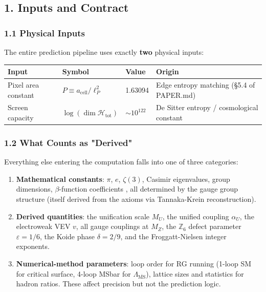 \subsection{1. Inputs and Contract}\label{1-inputs-and-contract}

\subsubsection{1.1 Physical Inputs}\label{11-physical-inputs}

The entire prediction pipeline uses exactly \textbf{two} physical inputs:

{\def\LTcaptype{none} %
\begin{longtable}[]{@{}llll@{}}
\toprule\noalign{}
Input & Symbol & Value & Origin \\
\midrule\noalign{}
\endhead
\bottomrule\noalign{}
\endlastfoot
Pixel area constant & \(P \equiv a_{\text{cell}}/\ell_P^2\) & 1.63094 & Edge entropy matching (§5.4 of PAPER.md) \\
Screen capacity & \(\log(\dim\mathcal{H}_{\text{tot}})\) & \(\sim 10^{122}\) & De Sitter entropy / cosmological constant \\
\end{longtable}
}

\subsubsection{1.2 What Counts as "Derived"}\label{12-what-counts-as-derived}

Everything else entering the computation falls into one of three categories:

\begin{enumerate}
\def\labelenumi{\arabic{enumi}.}
\item
  \textbf{Mathematical constants}: \(\pi\), \(e\), \(\zeta(3)\), Casimir eigenvalues, group dimensions, \(\beta\)-function coefficients , all determined by the gauge group structure (itself derived from the axioms via Tannaka-Krein reconstruction).
\item
  \textbf{Derived quantities}: the unification scale \(M_U\), the unified coupling \(\alpha_U\), the electroweak VEV \(v\), all gauge couplings at \(M_Z\), the \(\mathbb{Z}_6\) defect parameter \(\varepsilon = 1/6\), the Koide phase \(\delta = 2/9\), and the Froggatt-Nielsen integer exponents.
\item
  \textbf{Numerical-method parameters}: loop order for RG running (1-loop SM for critical surface, 4-loop MSbar for \(\Lambda_{\overline{\text{MS}}}\)), lattice sizes and statistics for hadron ratios. These affect precision but not the prediction logic.
\end{enumerate}

